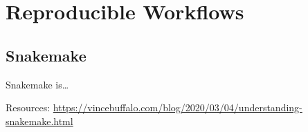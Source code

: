 \documentclass[
]{book}
\begin{document}
\hypertarget{reproducible-workflows}{%
\chapter{Reproducible Workflows}\label{reproducible-workflows}}

\hypertarget{snakemake}{%
\section{Snakemake}\label{snakemake}}

Snakemake is\ldots{}

Resources:
\url{https://vincebuffalo.com/blog/2020/03/04/understanding-snakemake.html}

  
\end{document}
